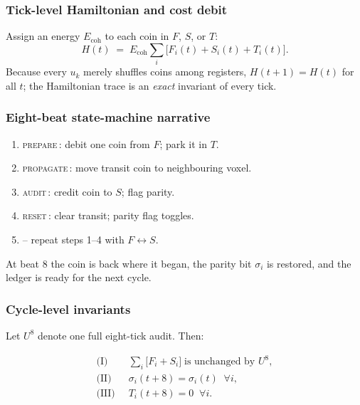 \documentclass[11pt,oneside]{book}
\begin{document}
\subsubsection{Tick-level Hamiltonian and cost debit}
\label{subsubsec:hamiltonian-update}
Assign an energy \(E_{\text{coh}}\) to each coin in \(F\), \(S\), or \(T\):
\[
  H(t)
  \;=\;
  E_{\text{coh}}
  \sum_{i}\bigl[F_{i}(t)+S_{i}(t)+T_{i}(t)\bigr].
\]
Because every \(u_{k}\) merely shuffles coins among registers,
\(
  H(t+1)=H(t)
\)
for all \(t\); the Hamiltonian trace is an \emph{exact} invariant of every
tick.

\subsubsection{Eight-beat state-machine narrative}
\label{subsubsec:state-machine}
\begin{enumerate}[leftmargin=3em,label=\textbf{Beat \arabic*:}]
  \item \textsc{prepare}\,: debit one coin from \(F\); park it in \(T\).
  \item \textsc{propagate}\,: move transit coin to neighbouring voxel.
  \item \textsc{audit}\,: credit coin to \(S\); flag parity.
  \item \textsc{reset}\,: clear transit; parity flag toggles.
  \item– repeat steps 1–4 with \(F\!\leftrightarrow\!S\).
\end{enumerate}
At beat 8 the coin is back where it began, the parity bit
\(\sigma_{i}\) is restored, and the ledger is ready for the next cycle.

\subsubsection{Cycle-level invariants}
\label{subsubsec:cycle-invariants}
Let \(U^{8}\) denote one full eight-tick audit.  Then:

\[
\begin{aligned}
\text{(I)}\;&\;
  \sum_{i}\bigl[F_{i}+S_{i}\bigr]\;\text{is unchanged by }U^{8},
\\
\text{(II)}\;&\;
  \sigma_{i}(t+8)=\sigma_{i}(t)\;\;\forall i,
\\
\text{(III)}\;&\;
  T_{i}(t+8)=0\;\;\forall i.
\end{aligned}
\]
\end{document}
